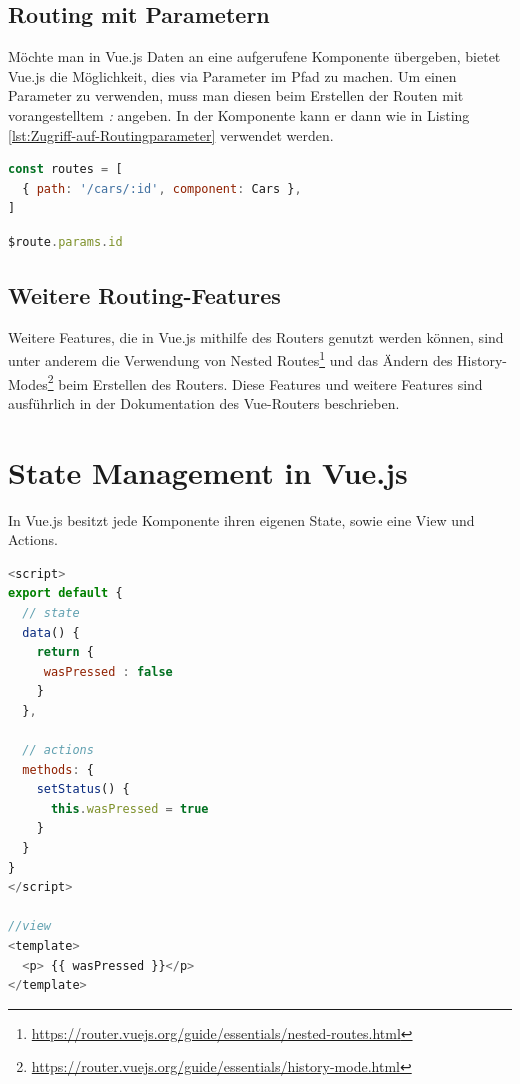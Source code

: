 \subsection*{Routing mit Parametern}
Möchte man in Vue.js Daten an eine aufgerufene Komponente übergeben, bietet Vue.js die Möglichkeit,
dies via Parameter im Pfad zu machen.
Um einen Parameter zu verwenden, muss man diesen beim Erstellen der Routen mit vorangestelltem \emph{:} angeben.
In der Komponente kann er dann wie in Listing \ref{lst:Zugriff-auf-Routingparameter} verwendet werden. \cite{vueRouterDynamicRouteMatching}
\begin{lstlisting}[caption={Route mit Parameter},language=javascript,label={lst:Route-mit-Parameter}]
const routes = [
  { path: '/cars/:id', component: Cars },
]
\end{lstlisting}

\begin{lstlisting}[caption={Zugriff auf Routingparameter},language=javascript,label={lst:Zugriff-auf-Routingparameter}]
$route.params.id
\end{lstlisting}

\subsection*{Weitere Routing-Features}
Weitere Features, die in Vue.js mithilfe des Routers genutzt werden können,
sind unter anderem die Verwendung von Nested Routes\footnote{\url{https://router.vuejs.org/guide/essentials/nested-routes.html}}
und das Ändern des History-Modes\footnote{\url{https://router.vuejs.org/guide/essentials/history-mode.html}} beim Erstellen des Routers.
Diese Features und weitere Features sind ausführlich in der Dokumentation des Vue-Routers beschrieben.

\section{State Management in Vue.js}\label{sec:state-management-in-vue.js}
In Vue.js besitzt jede Komponente ihren eigenen State, sowie eine View und Actions.
\begin{lstlisting}[caption={State, View und Actions},language=javascript,label={lst:State-View-und-Actions}]
<script>
export default {
  // state
  data() {
    return {
     wasPressed : false
    }
  },

  // actions
  methods: {
    setStatus() {
      this.wasPressed = true
    }
  }
}
</script>

//view
<template>
  <p> {{ wasPressed }}</p>
</template>
\end{lstlisting}

